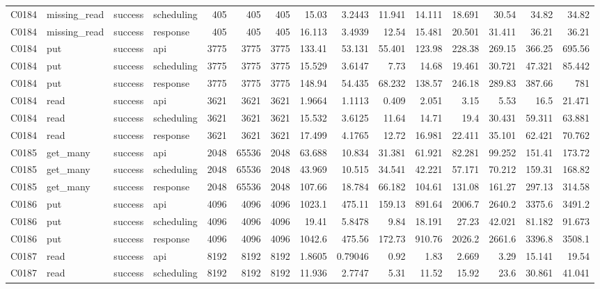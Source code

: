 \begin{landscape}
\begin{longtable}{llllrrrrrrrrrrr}
C0184 & missing\_\allowbreak{}read & success & scheduling & 405 & 405 & 405 & 15.03 & 3.2443 & 11.941 & 14.111 & 18.691 & 30.54 & 34.82 & 34.82\\
C0184 & missing\_\allowbreak{}read & success & response & 405 & 405 & 405 & 16.113 & 3.4939 & 12.54 & 15.481 & 20.501 & 31.411 & 36.21 & 36.21\\
C0184 & put & success & api & 3775 & 3775 & 3775 & 133.41 & 53.131 & 55.401 & 123.98 & 228.38 & 269.15 & 366.25 & 695.56\\
C0184 & put & success & scheduling & 3775 & 3775 & 3775 & 15.529 & 3.6147 & 7.73 & 14.68 & 19.461 & 30.721 & 47.321 & 85.442\\
C0184 & put & success & response & 3775 & 3775 & 3775 & 148.94 & 54.435 & 68.232 & 138.57 & 246.18 & 289.83 & 387.66 & 781\\
C0184 & read & success & api & 3621 & 3621 & 3621 & 1.9664 & 1.1113 & 0.409 & 2.051 & 3.15 & 5.53 & 16.5 & 21.471\\
C0184 & read & success & scheduling & 3621 & 3621 & 3621 & 15.532 & 3.6125 & 11.64 & 14.71 & 19.4 & 30.431 & 59.311 & 63.881\\
C0184 & read & success & response & 3621 & 3621 & 3621 & 17.499 & 4.1765 & 12.72 & 16.981 & 22.411 & 35.101 & 62.421 & 70.762\\
C0185 & get\_\allowbreak{}many & success & api & 2048 & 65536 & 2048 & 63.688 & 10.834 & 31.381 & 61.921 & 82.281 & 99.252 & 151.41 & 173.72\\
C0185 & get\_\allowbreak{}many & success & scheduling & 2048 & 65536 & 2048 & 43.969 & 10.515 & 34.541 & 42.221 & 57.171 & 70.212 & 159.31 & 168.82\\
C0185 & get\_\allowbreak{}many & success & response & 2048 & 65536 & 2048 & 107.66 & 18.784 & 66.182 & 104.61 & 131.08 & 161.27 & 297.13 & 314.58\\
C0186 & put & success & api & 4096 & 4096 & 4096 & 1023.1 & 475.11 & 159.13 & 891.64 & 2006.7 & 2640.2 & 3375.6 & 3491.2\\
C0186 & put & success & scheduling & 4096 & 4096 & 4096 & 19.41 & 5.8478 & 9.84 & 18.191 & 27.23 & 42.021 & 81.182 & 91.673\\
C0186 & put & success & response & 4096 & 4096 & 4096 & 1042.6 & 475.56 & 172.73 & 910.76 & 2026.2 & 2661.6 & 3396.8 & 3508.1\\
C0187 & read & success & api & 8192 & 8192 & 8192 & 1.8605 & 0.79046 & 0.92 & 1.83 & 2.669 & 3.29 & 15.141 & 19.54\\
C0187 & read & success & scheduling & 8192 & 8192 & 8192 & 11.936 & 2.7747 & 5.31 & 11.52 & 15.92 & 23.6 & 30.861 & 41.041\\

\end{longtable}
\end{landscape}
